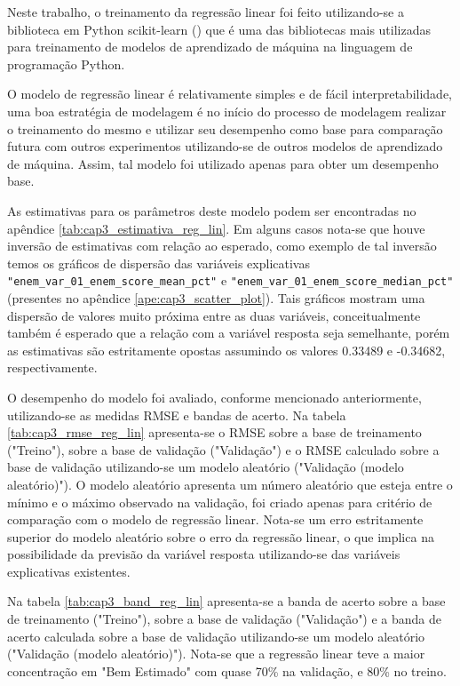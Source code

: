 Neste trabalho, o treinamento da regressão linear foi feito utilizando-se a biblioteca em Python scikit-learn (\citet{Sklearn}) que é uma das bibliotecas mais utilizadas para treinamento de modelos de aprendizado de máquina na linguagem de programação Python.

O modelo de regressão linear é relativamente simples e de fácil interpretabilidade, uma boa estratégia de modelagem é no início do processo de modelagem realizar o treinamento do mesmo e utilizar seu desempenho como base para comparação futura com outros experimentos utilizando-se de outros modelos de aprendizado de máquina. Assim, tal modelo foi utilizado apenas para obter um desempenho base.

As estimativas para os parâmetros deste modelo podem ser encontradas no apêndice \ref{tab:cap3_estimativa_reg_lin}. Em alguns casos nota-se que houve inversão de estimativas com relação ao esperado, como exemplo de tal inversão temos os gráficos de dispersão das variáveis explicativas \verb|"enem_var_01_enem_score_mean_pct"| e \verb|"enem_var_01_enem_score_median_pct"| (presentes no apêndice \ref{ape:cap3_scatter_plot}). Tais gráficos mostram uma dispersão de valores muito próxima entre as duas variáveis, conceitualmente também é esperado que a relação com a variável resposta seja semelhante, porém as estimativas são estritamente opostas assumindo os valores 0.33489 e -0.34682, respectivamente.

O desempenho do modelo foi avaliado, conforme mencionado anteriormente, utilizando-se as medidas RMSE e bandas de acerto. Na tabela \ref{tab:cap3_rmse_reg_lin} apresenta-se o RMSE sobre a base de treinamento ("Treino"), sobre a base de validação ("Validação") e o RMSE calculado sobre a base de validação utilizando-se um modelo aleatório ("Validação (modelo aleatório)"). O modelo aleatório apresenta um número aleatório que esteja entre o mínimo e o máximo observado na validação, foi criado apenas para critério de comparação com o modelo de regressão linear. Nota-se um erro estritamente superior do modelo aleatório sobre o erro da regressão linear, o que implica na possibilidade da previsão da variável resposta utilizando-se das variáveis explicativas existentes.

Na tabela \ref{tab:cap3_band_reg_lin} apresenta-se a banda de acerto sobre a base de treinamento ("Treino"), sobre a base de validação ("Validação") e a banda de acerto calculada sobre a base de validação utilizando-se um modelo aleatório ("Validação (modelo aleatório)"). Nota-se que a regressão linear teve a maior concentração em "Bem Estimado" com quase 70\% na validação, e 80\% no treino.

